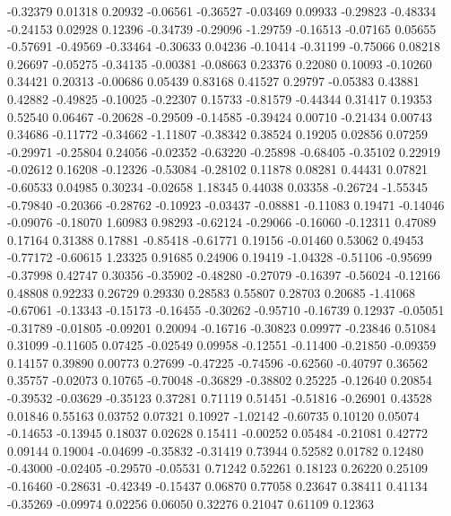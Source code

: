   -0.32379  0.01318
   0.20932 -0.06561
  -0.36527 -0.03469
   0.09933 -0.29823
  -0.48334 -0.24153
   0.02928  0.12396
  -0.34739 -0.29096
  -1.29759 -0.16513
  -0.07165  0.05655
  -0.57691 -0.49569
  -0.33464 -0.30633
   0.04236 -0.10414
  -0.31199 -0.75066
   0.08218  0.26697
  -0.05275 -0.34135
  -0.00381 -0.08663
   0.23376  0.22080
   0.10093 -0.10260
   0.34421  0.20313
  -0.00686  0.05439
   0.83168  0.41527
   0.29797 -0.05383
   0.43881  0.42882
  -0.49825 -0.10025
  -0.22307  0.15733
  -0.81579 -0.44344
   0.31417  0.19353
   0.52540  0.06467
  -0.20628 -0.29509
  -0.14585 -0.39424
   0.00710 -0.21434
   0.00743  0.34686
  -0.11772 -0.34662
  -1.11807 -0.38342
   0.38524  0.19205
   0.02856  0.07259
  -0.29971 -0.25804
   0.24056 -0.02352
  -0.63220 -0.25898
  -0.68405 -0.35102
   0.22919 -0.02612
   0.16208 -0.12326
  -0.53084 -0.28102
   0.11878  0.08281
   0.44431  0.07821
  -0.60533  0.04985
   0.30234 -0.02658
   1.18345  0.44038
   0.03358 -0.26724
  -1.55345 -0.79840
  -0.20366 -0.28762
  -0.10923 -0.03437
  -0.08881 -0.11083
   0.19471 -0.14046
  -0.09076 -0.18070
   1.60983  0.98293
  -0.62124 -0.29066
  -0.16060 -0.12311
   0.47089  0.17164
   0.31388  0.17881
  -0.85418 -0.61771
   0.19156 -0.01460
   0.53062  0.49453
  -0.77172 -0.60615
   1.23325  0.91685
   0.24906  0.19419
  -1.04328 -0.51106
  -0.95699 -0.37998
   0.42747  0.30356
  -0.35902 -0.48280
  -0.27079 -0.16397
  -0.56024 -0.12166
   0.48808  0.92233
   0.26729  0.29330
   0.28583  0.55807
   0.28703  0.20685
  -1.41068 -0.67061
  -0.13343 -0.15173
  -0.16455 -0.30262
  -0.95710 -0.16739
   0.12937 -0.05051
  -0.31789 -0.01805
  -0.09201  0.20094
  -0.16716 -0.30823
   0.09977 -0.23846
   0.51084  0.31099
  -0.11605  0.07425
  -0.02549  0.09958
  -0.12551 -0.11400
  -0.21850 -0.09359
   0.14157  0.39890
   0.00773  0.27699
  -0.47225 -0.74596
  -0.62560 -0.40797
   0.36562  0.35757
  -0.02073  0.10765
  -0.70048 -0.36829
  -0.38802  0.25225
  -0.12640  0.20854
  -0.39532 -0.03629
  -0.35123  0.37281
   0.71119  0.51451
  -0.51816 -0.26901
   0.43528  0.01846
   0.55163  0.03752
   0.07321  0.10927
  -1.02142 -0.60735
   0.10120  0.05074
  -0.14653 -0.13945
   0.18037  0.02628
   0.15411 -0.00252
   0.05484 -0.21081
   0.42772  0.09144
   0.19004 -0.04699
  -0.35832 -0.31419
   0.73944  0.52582
   0.01782  0.12480
  -0.43000 -0.02405
  -0.29570 -0.05531
   0.71242  0.52261
   0.18123  0.26220
   0.25109 -0.16460
  -0.28631 -0.42349
  -0.15437  0.06870
   0.77058  0.23647
   0.38411  0.41134
  -0.35269 -0.09974
   0.02256  0.06050
   0.32276  0.21047
   0.61109  0.12363
